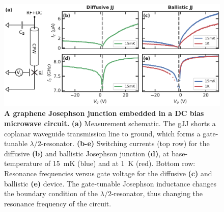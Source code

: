 \begin{figure}
	\centering
	\includegraphics[width=\linewidth]{chapter-gJJ-CPR/figs/Figure1}
	\caption{
	\textbf{A graphene Josephson junction embedded in a DC bias microwave circuit.}
	\textbf{(a)} Measurement schematic.
	The gJJ shorts a coplanar waveguide transmission line to ground, which
forms a gate-tunable $\lambda/2$-resonator.
	\textbf{(b-e)} Switching currents (top row) for the diffusive \textbf{(b)} and ballistic Josephson junction \textbf{(d)}, at base-temperature of \SI{15}{\milli\kelvin} (blue) and at \SI{1}{\kelvin} (red).
	Bottom row: Resonance frequencies versus gate voltage for the diffusive \textbf{(c)} and ballistic \textbf{(e)} device.
	The gate-tunable Josephson inductance changes the
boundary condition of the $\lambda/2$-resonator, thus changing the resonance frequency of the circuit.}
	\label{fig:figure1}
\end{figure}

